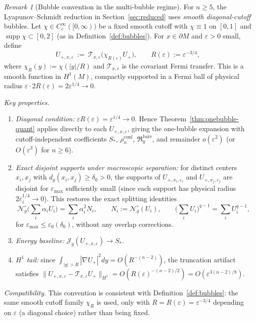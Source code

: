 \documentclass[11pt,reqno,a4paper]{amsart}
\DeclareMathOperator{\supp}{supp}
\numberwithin{equation}{section}
\theoremstyle{plain}
\theoremstyle{remark}
\newtheorem{remark}[theorem]{Remark}
\theoremstyle{plain}
\begin{document}
\begin{remark}[Bubble convention in the multi-bubble regime]\label{rem:multibubble-cutoff}
For $n\ge5$, the Lyapunov--Schmidt reduction in Section~\ref{sec:reduced} uses
\emph{smooth diagonal-cutoff} bubbles.
Let $\chi\in C^\infty_c([0,\infty))$ be a fixed smooth cutoff with
$\chi\equiv1$ on $[0,1]$ and $\supp\chi\subset[0,2]$
(as in Definition~\ref{def:bubbles}).
For $x\in\partial M$ and $\varepsilon>0$ small, define
\begin{equation}\label{eq:Ucutoff-R0}
U_{+,x,\varepsilon}
\ :=\ \mathcal T_{x,\varepsilon}\big(\chi_{R(\varepsilon)}U_+\big),
\qquad R(\varepsilon):=\varepsilon^{-3/4},
\end{equation}
where $\chi_R(y):=\chi(|y|/R)$ and $\mathcal T_{x,\varepsilon}$ is the covariant Fermi transfer.
This is a smooth function in $H^1(M)$, compactly supported in a Fermi ball of
physical radius $\varepsilon\cdot 2R(\varepsilon)=2\varepsilon^{1/4}\to0$.

\noindent\emph{Key properties.}
\begin{enumerate}[label=(\roman*),leftmargin=2em]
\item \emph{Diagonal condition:} $\varepsilon R(\varepsilon)=\varepsilon^{1/4}\to0$.
Hence Theorem~\ref{thm:onebubble-quant} applies directly to each $U_{+,x,\varepsilon}$,
giving the one-bubble expansion with cutoff-independent coefficients
$S_\ast$, $\rho_n^{\mathrm{conf}}$, $\mathfrak R_g^{\mathrm{bare}}$,
and remainder $o(\varepsilon^2)$ (or $O(\varepsilon^3)$ for $n\ge6$).
\item \emph{Exact disjoint supports under macroscopic separation:}
for distinct centers $x_i,x_j$ with $d_g(x_i,x_j)\ge\delta_0>0$,
the supports of $U_{+,x_i,\varepsilon_i}$ and $U_{+,x_j,\varepsilon_j}$
are disjoint for $\varepsilon_{\max}$ sufficiently small
(since each support has physical radius $2\varepsilon_i^{1/4}\to0$).
This restores the exact splitting identities
\begin{equation}\label{eq:exact-disjoint}
\mathcal N_g^\circ\Big(\sum_i\alpha_iU_i\Big)=\sum_i\alpha_i^2N_i,
\qquad N_i:=\mathcal N_g^\circ(U_i),
\qquad
\Big(\sum_iU_i\Big)^{q-1}=\sum_iU_i^{q-1},
\end{equation}
for $\varepsilon_{\max}\le\varepsilon_0(\delta_0)$, without any overlap corrections.
\item \emph{Energy baseline:} $\mathcal J_g(U_{+,x,\varepsilon})\to S_\ast$.
\item \emph{$H^1$ tail:} since $\int_{|y|>R}|\nabla U_+|^2dy=O(R^{-(n-2)})$,
the truncation artifact satisfies
$\|U_{+,x,\varepsilon}-\mathcal T_{x,\varepsilon}U_+\|_{H^1}
=O(R(\varepsilon)^{-(n-2)/2})=O(\varepsilon^{3(n-2)/8})$.
\end{enumerate}

\noindent\emph{Compatibility.}
This convention is consistent with Definition~\ref{def:bubbles}:
the same smooth cutoff family $\chi_R$ is used, only with $R=R(\varepsilon)=\varepsilon^{-3/4}$
depending on $\varepsilon$ (a diagonal choice) rather than being fixed.
\end{remark}
\end{document}
